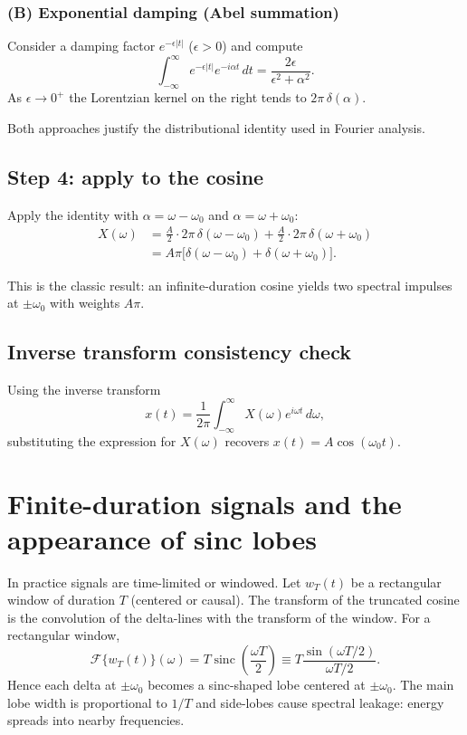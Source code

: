\documentclass[a4paper]{article}
\begin{document}
\subsubsection{(B) Exponential damping (Abel summation)}
Consider a damping factor $e^{-\epsilon |t|}$ ($\epsilon>0$) and compute
\begin{equation}
\int_{-\infty}^{\infty} e^{-\epsilon|t|} e^{-i\alpha t}\,dt=\frac{2\epsilon}{\epsilon^2+\alpha^2}.
\end{equation}
As $\epsilon\to0^+$ the Lorentzian kernel on the right tends to $2\pi\,\delta(\alpha)$.

Both approaches justify the distributional identity used in Fourier analysis.

\subsection{Step 4: apply to the cosine}
Apply the identity with $\alpha=\omega-\omega_0$ and $\alpha=\omega+\omega_0$:
\begin{align}
X(\omega)&=\frac{A}{2}\cdot 2\pi\,\delta(\omega-\omega_0) + \frac{A}{2}\cdot 2\pi\,\delta(\omega+\omega_0)\\
&=A\pi\big[\delta(\omega-\omega_0)+\delta(\omega+\omega_0)\big].
\end{align}

This is the classic result: an infinite-duration cosine yields two spectral impulses at $\pm\omega_0$ with weights $A\pi$.

\subsection{Inverse transform consistency check}
Using the inverse transform
\begin{equation}
x(t)=\frac{1}{2\pi}\int_{-\infty}^{\infty} X(\omega) e^{i\omega t}\,d\omega,
\end{equation}
substituting the expression for $X(\omega)$ recovers $x(t)=A\cos(\omega_0 t)$.

\section{Finite-duration signals and the appearance of sinc lobes}
In practice signals are time-limited or windowed. Let $w_T(t)$ be a rectangular window of duration $T$ (centered or causal). The transform of the truncated cosine is the convolution of the delta-lines with the transform of the window. For a rectangular window,
\begin{equation}
\mathcal{F}\{w_T(t)\}(\omega) = T\operatorname{sinc}\left(\frac{\omega T}{2}\right)\equiv T\frac{\sin(\omega T/2)}{\omega T/2}.
\end{equation}
Hence each delta at $\pm\omega_0$ becomes a sinc-shaped lobe centered at $\pm\omega_0$. The main lobe width is proportional to $1/T$ and side-lobes cause spectral leakage: energy spreads into nearby frequencies.
\end{document}
